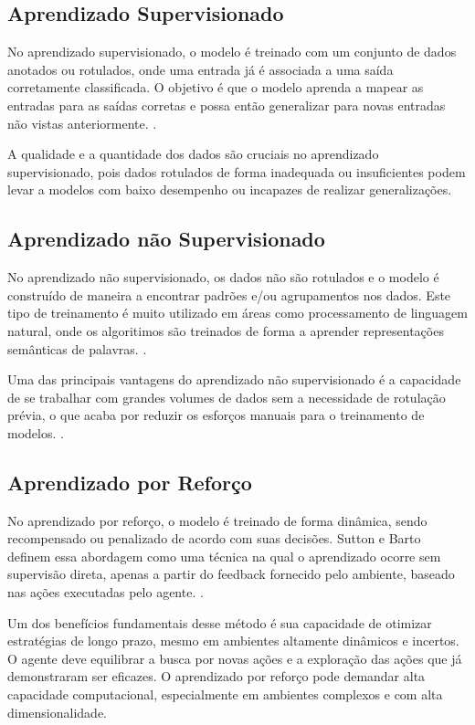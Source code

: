 \subsection{Aprendizado Supervisionado}\label{subsec:ml1}

No aprendizado supervisionado, o modelo é treinado com um conjunto de dados anotados ou rotulados, onde uma entrada já é associada a uma saída corretamente classificada. O objetivo é que o modelo aprenda a mapear as entradas para as saídas corretas e possa então generalizar para novas entradas não vistas anteriormente. \cite{Goodfellow2016}.

A qualidade e a quantidade dos dados são cruciais no aprendizado supervisionado, pois dados rotulados de forma inadequada ou insuficientes podem levar a modelos com baixo desempenho ou incapazes de realizar generalizações.

\subsection{Aprendizado não Supervisionado}\label{subsec:ml2}

No aprendizado não supervisionado, os dados não são rotulados e o modelo é construído de maneira a encontrar padrões e/ou agrupamentos nos dados. Este tipo de treinamento é muito utilizado em áreas como processamento de linguagem natural, onde os algoritimos são treinados de forma a aprender representações semânticas de palavras. \cite{Goodfellow2016}.

Uma das principais vantagens do aprendizado não supervisionado é a capacidade de se trabalhar com grandes volumes de dados sem a necessidade de rotulação prévia, o que acaba por reduzir os esforços manuais para o treinamento de modelos. \cite{Murphy2012}.  

\subsection{Aprendizado por Reforço}\label{subsec:ml3}

No aprendizado por reforço, o modelo é treinado de forma dinâmica, sendo recompensado ou penalizado de acordo com suas decisões. Sutton e Barto definem essa abordagem como uma técnica na qual o aprendizado ocorre sem supervisão direta, apenas a partir do feedback fornecido pelo ambiente, baseado nas ações executadas pelo agente. \cite{SuttonBarto2018}.

Um dos benefícios fundamentais desse método é sua capacidade de otimizar estratégias de longo prazo, mesmo em ambientes altamente dinâmicos e incertos. O agente deve equilibrar a busca por novas ações e a exploração das ações que já demonstraram ser eficazes. O aprendizado por reforço pode demandar alta capacidade computacional, especialmente em ambientes complexos e com alta dimensionalidade. \cite{SuttonBarto2018}

